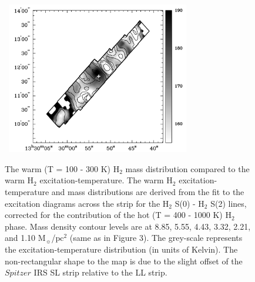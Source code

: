 \documentclass[manuscript]{aastex}
\begin{document}
\begin{figure}[!h]
\centerline{\hbox{\hspace{0.0in}
\includegraphics[width=8cm,angle=0]{bw_warm_h2.jpg}}}
\caption{The warm (T = 100 - 300 K) $\mathrm{H_2}$ mass distribution compared to the warm $\mathrm{H_2}$ excitation-temperature.  The warm $\mathrm{H_2}$ excitation-temperature and mass distributions are derived from the fit to the excitation diagrams across the strip for the $\mathrm{H_2}$ S(0) - $\mathrm{H_2}$ S(2) lines, corrected for the contribution of the hot (T = 400 - 1000 K) $\mathrm{H_2}$ phase.  Mass density contour levels are at 8.85, 5.55, 4.43, 3.32, 2.21, and 1.10 $\mathrm{M_\sun}$/$\mathrm{pc^2}$ (same as in Figure 3).
The grey-scale represents the excitation-temperature distribution (in units of Kelvin).  The non-rectangular shape to the map is due to the slight offset of the $Spitzer$ IRS SL strip relative to the LL strip.  \label{fig4}}
\end{figure}
\end{document}
